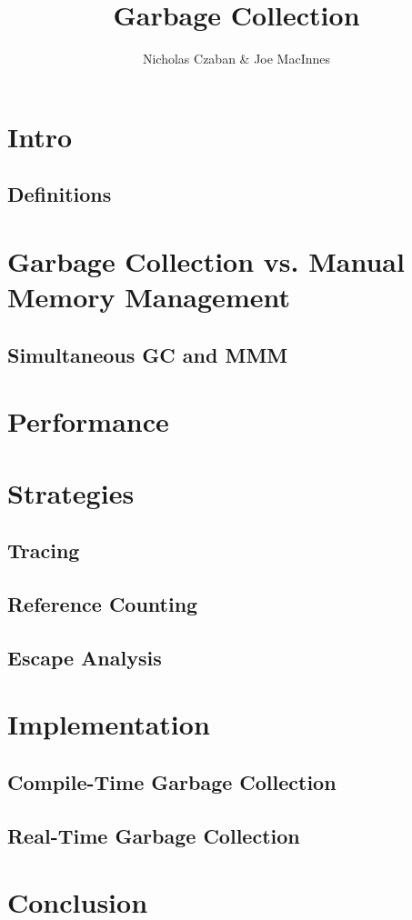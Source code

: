 \documentclass{article}
\begin{document}
\title{Garbage Collection}
\author{Nicholas Czaban \& Joe MacInnes}
\maketitle
\section{Intro}
\subsection{Definitions}
\section{Garbage Collection vs. Manual Memory Management}
\subsection{Simultaneous GC and MMM}
\section{Performance}
\section{Strategies}
\subsection{Tracing}
\subsection{Reference Counting}
\subsection{Escape Analysis}
\section{Implementation}
\subsection{Compile-Time Garbage Collection}
\subsection{Real-Time Garbage Collection}
\section{Conclusion}
\end{document}
